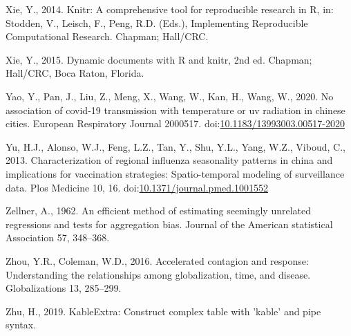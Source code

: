 \documentclass[]{elsarticle} %
\begin{document}
\leavevmode\hypertarget{ref-Xie2014}{}%
Xie, Y., 2014. Knitr: A comprehensive tool for reproducible research in
R, in: Stodden, V., Leisch, F., Peng, R.D. (Eds.), Implementing
Reproducible Computational Research. Chapman; Hall/CRC.

\leavevmode\hypertarget{ref-Xie2015}{}%
Xie, Y., 2015. Dynamic documents with R and knitr, 2nd ed. Chapman;
Hall/CRC, Boca Raton, Florida.

\leavevmode\hypertarget{ref-Yao2020association}{}%
Yao, Y., Pan, J., Liu, Z., Meng, X., Wang, W., Kan, H., Wang, W., 2020.
No association of covid-19 transmission with temperature or uv radiation
in chinese cities. European Respiratory Journal 2000517.
doi:\href{https://doi.org/10.1183/13993003.00517-2020}{10.1183/13993003.00517-2020}

\leavevmode\hypertarget{ref-Yu2013characterization}{}%
Yu, H.J., Alonso, W.J., Feng, L.Z., Tan, Y., Shu, Y.L., Yang, W.Z.,
Viboud, C., 2013. Characterization of regional influenza seasonality
patterns in china and implications for vaccination strategies:
Spatio-temporal modeling of surveillance data. Plos Medicine 10, 16.
doi:\href{https://doi.org/10.1371/journal.pmed.1001552}{10.1371/journal.pmed.1001552}

\leavevmode\hypertarget{ref-Zellner1962efficient}{}%
Zellner, A., 1962. An efficient method of estimating seemingly unrelated
regressions and tests for aggregation bias. Journal of the American
statistical Association 57, 348--368.

\leavevmode\hypertarget{ref-Zhou2016accelerated}{}%
Zhou, Y.R., Coleman, W.D., 2016. Accelerated contagion and response:
Understanding the relationships among globalization, time, and disease.
Globalizations 13, 285--299.

\leavevmode\hypertarget{ref-Zhu2019}{}%
Zhu, H., 2019. KableExtra: Construct complex table with 'kable' and pipe
syntax.
\end{document}
